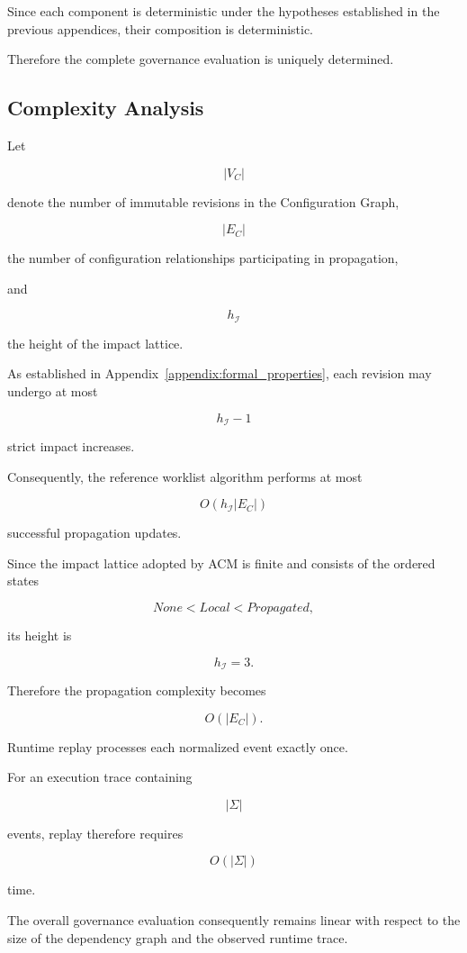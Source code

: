 \documentclass[10pt]{article}
\begin{document}
Since each component is deterministic under the hypotheses established in the previous appendices, their composition is deterministic.

Therefore the complete governance evaluation is uniquely determined. 


\subsection{Complexity Analysis}
\label{appendix:complexity_analysis}

Let

\[
|V_C|
\]

denote the number of immutable revisions in the Configuration Graph,

\[
|E_C|
\]

the number of configuration relationships participating in propagation,

and

\[
h_{\mathcal I}
\]

the height of the impact lattice.

As established in Appendix~\ref{appendix:formal_properties},
each revision may undergo at most

\[
h_{\mathcal I}-1
\]

strict impact increases.

Consequently, the reference worklist algorithm performs at most

\[
O(h_{\mathcal I}|E_C|)
\]

successful propagation updates.

Since the impact lattice adopted by ACM is finite and consists of the ordered
states

\[
None
<
Local
<
Propagated,
\]

its height is

\[
h_{\mathcal I}=3.
\]

Therefore the propagation complexity becomes

\[
O(|E_C|).
\]

Runtime replay processes each normalized event exactly once.

For an execution trace containing

\[
|\Sigma|
\]

events, replay therefore requires

\[
O(|\Sigma|)
\]

time.

The overall governance evaluation consequently remains linear with respect to
the size of the dependency graph and the observed runtime trace.
\end{document}
